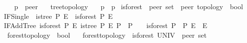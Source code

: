 \begin{isabellebody}
\ \ \ p\ {\isacharcolon}{\kern0pt}{\isacharcolon}{\kern0pt}\ {\isachardoublequoteopen}{\isacharprime}{\kern0pt}peer{\isachardoublequoteclose}\isanewline
\ \ \ {\isachardoublequoteopen}tree{\isacharunderscore}{\kern0pt}topology{\isachardoublequoteclose}\isanewline
\ \ \ {\isachardoublequoteopen}{\isasymG}{\isasymlangle}{\isasymrightarrow}p{\isasymrangle}\ {\isacharequal}{\kern0pt}\ {\isasymP}\isactrlsub {\isacharquery}{\kern0pt}{\isacharparenleft}{\kern0pt}p{\isacharparenright}{\kern0pt}{\isachardoublequoteclose}\isanewline
%
\isadelimproof
%
\endisadelimproof
%
\isatagproof
{}\isamarkupfalse%
%
\endisatagproof
{\isafoldproof}%
%
\isadelimproof
%
\endisadelimproof
%
\isadelimdocument
%
\endisadelimdocument
%
\isatagdocument
%
\isamarkuptrue%
%
\endisatagdocument
{\isafolddocument}%
%
\isadelimdocument
%
\endisadelimdocument
{}\isamarkupfalse%
\ is{\isacharunderscore}{\kern0pt}forest\ {\isacharcolon}{\kern0pt}{\isacharcolon}{\kern0pt}\ {\isachardoublequoteopen}{\isacharprime}{\kern0pt}peer\ set\ {\isasymRightarrow}\ {\isacharprime}{\kern0pt}peer\ topology\ {\isasymRightarrow}\ bool{\isachardoublequoteclose}\ \isanewline
IFSingle{\isacharcolon}{\kern0pt}\ \ {\isachardoublequoteopen}is{\isacharunderscore}{\kern0pt}tree\ P\ E\ {\isasymLongrightarrow}\ is{\isacharunderscore}{\kern0pt}forest\ P\ E{\isachardoublequoteclose}\ {\isacharbar}{\kern0pt}\isanewline
IFAddTree{\isacharcolon}{\kern0pt}\ {\isachardoublequoteopen}{\isasymlbrakk}is{\isacharunderscore}{\kern0pt}forest\ P{}\ E{}{\isacharsemicolon}{\kern0pt}\ is{\isacharunderscore}{\kern0pt}tree\ P{}\ E{}{\isacharsemicolon}{\kern0pt}\ P{}\ {\isasyminter}\ P{}\ {\isacharequal}{\kern0pt}\ {\isacharbraceleft}{\kern0pt}{\isacharbraceright}{\kern0pt}{\isasymrbrakk}\ {\isasymLongrightarrow}\ is{\isacharunderscore}{\kern0pt}forest\ {\isacharparenleft}{\kern0pt}P{}\ {\isasymunion}\ P{}{\isacharparenright}{\kern0pt}\ {\isacharparenleft}{\kern0pt}E{}\ {\isasymunion}\ E{}{\isacharparenright}{\kern0pt}{\isachardoublequoteclose}\isanewline
\isanewline
{}\isamarkupfalse%
\ forest{\isacharunderscore}{\kern0pt}topology\ {\isacharcolon}{\kern0pt}{\isacharcolon}{\kern0pt}\ {\isachardoublequoteopen}bool{\isachardoublequoteclose}\ \isanewline
\ \ {\isachardoublequoteopen}forest{\isacharunderscore}{\kern0pt}topology\ {\isasymequiv}\ is{\isacharunderscore}{\kern0pt}forest\ {\isacharparenleft}{\kern0pt}UNIV\ {\isacharcolon}{\kern0pt}{\isacharcolon}{\kern0pt}\ {\isacharprime}{\kern0pt}peer\ set{\isacharparenright}{\kern0pt}\ {\isacharparenleft}{\kern0pt}{\isasymG}{\isacharparenright}{\kern0pt}{\isachardoublequoteclose}\isanewline
\isanewline
{}\isamarkupfalse%
\isanewline
%
\isadelimtheory
\isanewline
%
\endisadelimtheory
%
\isatagtheory
{}\isamarkupfalse%
%
\endisatagtheory
{\isafoldtheory}%
%
\isadelimtheory
%
\endisadelimtheory
%
\end{isabellebody}%
